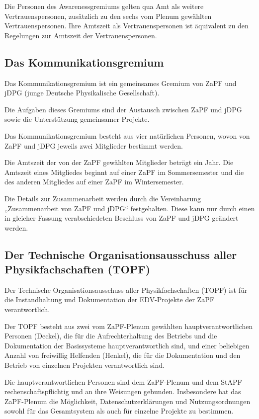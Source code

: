 \documentclass[
  a4paper,
  oneside]{scrartcl}
\begin{document}
Die Personen des Awarenessgremiums gelten qua Amt als weitere
Vertrauenspersonen, zusätzlich zu den sechs vom Plenum gewählten
Vertrauenspersonen. Ihre Amtszeit als Vertrauenspersonen ist äquivalent
zu den Regelungen zur Amtszeit der Vertrauenspersonen.

\subsection{Das Kommunikationsgremium}\label{das-kommunikationsgremium}

Das Kommunikationsgremium ist ein gemeinsames Gremium von ZaPF und jDPG
(junge Deutsche Physikalische Gesellschaft).

Die Aufgaben dieses Gremiums sind der Austausch zwischen ZaPF und jDPG
sowie die Unterstützung gemeinsamer Projekte.

Das Kommunikationsgremium besteht aus vier natürlichen Personen, wovon
von ZaPF und jDPG jeweils zwei Mitglieder bestimmt werden.

Die Amtszeit der von der ZaPF gewählten Mitglieder beträgt ein Jahr. Die
Amtszeit eines Mitgliedes beginnt auf einer ZaPF im Sommersemester und
die des anderen Mitgliedes auf einer ZaPF im Wintersemester.

Die Details zur Zusammenarbeit werden durch die Vereinbarung
„Zusammenarbeit von ZaPF und jDPG`` festgehalten. Diese kann nur durch
einen in gleicher Fassung verabschiedeten Beschluss von ZaPF und jDPG
geändert werden.

\subsection{Der Technische Organisationsausschuss aller
Physikfachschaften
(TOPF)}\label{der-technische-organisationsausschuss-aller-physikfachschaften-topf}

Der Technische Organisationsausschuss aller Physikfachschaften (TOPF)
ist für die Instandhaltung und Dokumentation der EDV-Projekte der ZaPF
verantwortlich.

Der TOPF besteht aus zwei vom ZaPF-Plenum gewählten
hauptverantwortlichen Personen (Deckel), die für die Aufrechterhaltung
des Betriebs und die Dokumentation der Basissysteme hauptverantwortlich
sind, und einer beliebigen Anzahl von freiwillig Helfenden (Henkel), die
für die Dokumentation und den Betrieb von einzelnen Projekten
verantwortlich sind.

Die hauptverantwortlichen Personen sind dem ZaPF-Plenum und dem StAPF
rechenschaftspflichtig und an ihre Weisungen gebunden. Insbesondere hat
das ZaPF-Plenum die Möglichkeit, Datenschutzerklärungen und
Nutzungsordnungen sowohl für das Gesamtsystem als auch für einzelne
Projekte zu bestimmen.
\end{document}
